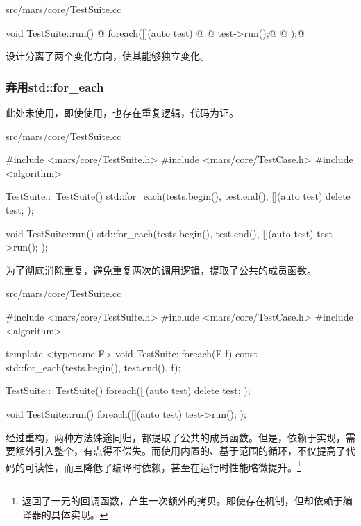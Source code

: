 \begin{content}
\begin{diff}{src/mars/core/TestSuite.cc}
\begin{minicpp}
void TestSuite::run() {
@  foreach([](auto test) {@
@    test->run();@
@  });@
}
 \end{minicpp}
\end{diff}

设计分离了两个变化方向，使其能够独立变化。

\begin{enum}
\end{enum}

\subsubsection{弃用std::for\_each}

此处未使用，即使使用，也存在重复逻辑，代码为证。

\begin{nodiff}{src/mars/core/TestSuite.cc}
 \begin{c++}
#include <mars/core/TestSuite.h>
#include <mars/core/TestCase.h>
#include <algorithm>

TestSuite::~TestSuite() {
  std::for_each(tests.begin(), test.end(), [](auto test){
    delete test;
  });
}

void TestSuite::run() {
  std::for_each(tests.begin(), test.end(), [](auto test){
    test->run();
  });
}
 \end{c++}
\end{nodiff}

为了彻底消除重复，避免重复两次的调用逻辑，提取了公共的成员函数。

\begin{nodiff}{src/mars/core/TestSuite.cc}
 \begin{c++}
#include <mars/core/TestSuite.h>
#include <mars/core/TestCase.h>
#include <algorithm>

template <typename F>
void TestSuite::foreach(F f) const {
  std::for_each(tests.begin(), test.end(), f);
}

TestSuite::~TestSuite() {
  foreach([](auto test){
    delete test;
  });
}

void TestSuite::run() {
  foreach([](auto test){
    test->run();
  });
}
 \end{c++}
\end{nodiff}

经过重构，两种方法殊途同归，都提取了公共的成员函数。但是，依赖于实现，需要额外引入整个，有点得不偿失。而使用内置的、基于范围的循环，不仅提高了代码的可读性，而且降低了编译时依赖，甚至在运行时性能略微提升。\footnote{返回了一元的回调函数，产生一次额外的拷贝。即使存在机制，但却依赖于编译器的具体实现。}


\end{content}
